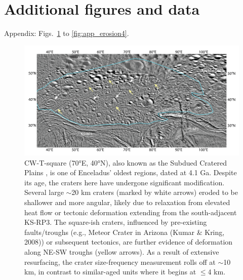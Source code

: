 \documentclass[preprint,11pt,3p,times,authoryear]{elsarticle}
\begin{document}
{\section{Additional figures and data}
\setcounter{figure}{0}
Appendix: Figs.~\ref{fig:app_erosion1} to \ref{fig:app_erosion4}.


\begin{figure}[H]
    \includegraphics[width=1.0\linewidth]{fig/FigS4B_CW-T-square.png}
    \caption{CW-T-square (70°E, 40°N), also known as the Subdued Cratered Plains \citep{CrowWillard2015}, is one of Enceladus' oldest regions, dated at 4.1 Ga. Despite its age, the craters here have undergone significant modification. Several large $\sim$20 km craters (marked by white arrows) eroded to be shallower and more angular, likely due to relaxation from elevated heat flow \citep{Bland2012} or tectonic deformation extending from the south-adjacent KS-RP3. The square-ish craters, influenced by pre-existing faults/troughs (e.g., Meteor Crater in Arizona (Kumar \& Kring, 2008)) or subsequent tectonics, are further evidence of deformation along NE-SW troughs (yellow arrows). As a result of extensive resurfacing, the crater size-frequency measurement rolls off at $\sim$10 km, in contrast to similar-aged units where it begins at $\le$4 km.}
    \label{fig:app_erosion1}
\end{figure}


}
\end{document}
